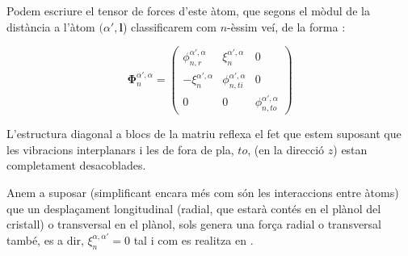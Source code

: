 \documentclass[12pt]{article} %
\let\vec\mathbf %
\begin{document}
Podem escriure el tensor de forces d'este àtom, que segons el mòdul de la distància a l'àtom $(\alpha',\vec l$) classificarem com $n$-èssim veí, de la forma \cite{wirtz04_phonon_disper_graph_revis}:


\begin{equation}
\vec\Phi_n^{\alpha',\alpha}=\begin{pmatrix}
\phi_{n,r}^{\alpha',\alpha}&\xi_n^{\alpha',\alpha} &0\\
-\xi_n^{\alpha',\alpha} & \phi_{n,ti}^{\alpha',\alpha} & 0 \\
0 & 0 & \phi_{n,to}^{\alpha',\alpha}
\end{pmatrix}
\label{eq:tensordeforces}
\end{equation}

L'estructura diagonal a blocs de la matriu reflexa el fet que estem suposant que  les vibracions interplanars i les de fora de pla, $to$, (en la direcció $z$) estan completament desacoblades.

Anem a suposar (simplificant encara més com són les interaccions entre àtoms) que un despla\c{c}ament longitudinal (radial, que estarà contés en el plànol del cristall) o transversal en el plànol, sols genera una força radial o transversal també, es a dir, $\xi_n^{\alpha,\alpha'}=0$ tal i com es realitza en \cite{Balkanski_2000}. %





\end{document}
